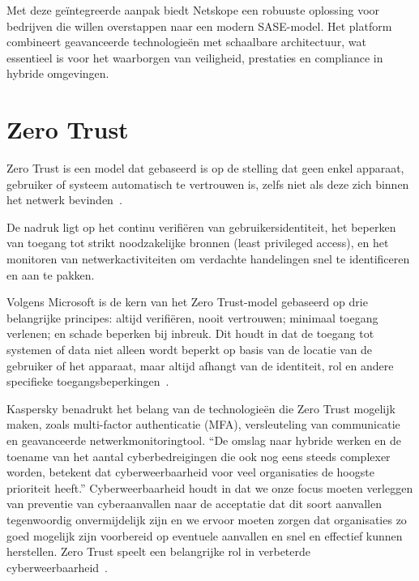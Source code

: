 \vspace{2ex}

Met deze geïntegreerde aanpak biedt Netskope een robuuste oplossing voor bedrijven die willen overstappen naar een modern SASE-model. Het platform combineert geavanceerde technologieën met schaalbare architectuur, wat essentieel is voor het waarborgen van veiligheid, prestaties en compliance in hybride omgevingen.

\section{Zero Trust}
Zero Trust is een model dat gebaseerd is op de stelling dat geen enkel apparaat, gebruiker of systeem automatisch te vertrouwen is, zelfs niet als deze zich binnen het netwerk bevinden~\autocite{Netskope2024}.

\vspace{2ex}

De nadruk ligt op het continu verifiëren van gebruikersidentiteit, het beperken van toegang tot strikt noodzakelijke bronnen (least privileged access), en het monitoren van netwerkactiviteiten om verdachte handelingen snel te identificeren en aan te pakken.

\vspace{2ex}

Volgens Microsoft is de kern van het Zero Trust-model gebaseerd op drie belangrijke principes: altijd verifiëren, nooit vertrouwen; minimaal toegang verlenen; en schade beperken bij inbreuk. Dit houdt in dat de toegang tot systemen of data niet alleen wordt beperkt op basis van de locatie van de gebruiker of het apparaat, maar altijd afhangt van de identiteit, rol en andere specifieke toegangsbeperkingen~\autocite{Microsoft2024}. 

\vspace{2ex}

Kaspersky benadrukt het belang van de technologieën die Zero Trust mogelijk maken, zoals multi-factor authenticatie (MFA), versleuteling van communicatie en geavanceerde netwerkmonitoringtool. ``De omslag naar hybride werken en de toename van het aantal cyberbedreigingen die ook nog eens steeds complexer worden, betekent dat cyberweerbaarheid voor veel organisaties de hoogste prioriteit heeft.'' Cyberweerbaarheid houdt in dat we onze focus moeten verleggen van preventie van cyberaanvallen naar de acceptatie dat dit soort aanvallen tegenwoordig onvermijdelijk zijn en we ervoor moeten zorgen dat organisaties zo goed mogelijk zijn voorbereid op eventuele aanvallen en snel en effectief kunnen herstellen. Zero Trust speelt een belangrijke rol in verbeterde cyberweerbaarheid~\autocite{Kaspersky2024}.


